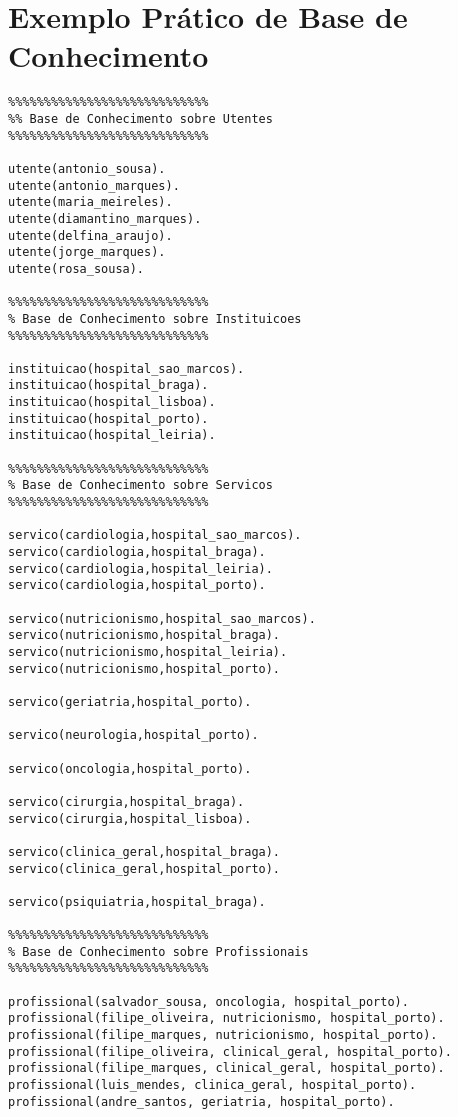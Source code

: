\documentclass[
  oneside,
  10pt, a4paper,
  footinclude=true,
  headinclude=true,
  cleardoublepage=empty
]{scrbook}
\begin{document}
\section{Exemplo Prático de Base de Conhecimento}
	\label{base_conhecimento_anexo}
	\begin{lstlisting}	
%%%%%%%%%%%%%%%%%%%%%%%%%%%%
%% Base de Conhecimento sobre Utentes
%%%%%%%%%%%%%%%%%%%%%%%%%%%%

utente(antonio_sousa).
utente(antonio_marques).
utente(maria_meireles).
utente(diamantino_marques).
utente(delfina_araujo).
utente(jorge_marques).
utente(rosa_sousa).

%%%%%%%%%%%%%%%%%%%%%%%%%%%%
% Base de Conhecimento sobre Instituicoes 
%%%%%%%%%%%%%%%%%%%%%%%%%%%%

instituicao(hospital_sao_marcos).
instituicao(hospital_braga).
instituicao(hospital_lisboa).
instituicao(hospital_porto).
instituicao(hospital_leiria).

%%%%%%%%%%%%%%%%%%%%%%%%%%%%
% Base de Conhecimento sobre Servicos 
%%%%%%%%%%%%%%%%%%%%%%%%%%%%

servico(cardiologia,hospital_sao_marcos).
servico(cardiologia,hospital_braga).
servico(cardiologia,hospital_leiria).
servico(cardiologia,hospital_porto).

servico(nutricionismo,hospital_sao_marcos).
servico(nutricionismo,hospital_braga).
servico(nutricionismo,hospital_leiria).
servico(nutricionismo,hospital_porto).

servico(geriatria,hospital_porto).

servico(neurologia,hospital_porto).

servico(oncologia,hospital_porto).

servico(cirurgia,hospital_braga).
servico(cirurgia,hospital_lisboa).

servico(clinica_geral,hospital_braga).
servico(clinica_geral,hospital_porto).

servico(psiquiatria,hospital_braga).

%%%%%%%%%%%%%%%%%%%%%%%%%%%%
% Base de Conhecimento sobre Profissionais 
%%%%%%%%%%%%%%%%%%%%%%%%%%%%

profissional(salvador_sousa, oncologia, hospital_porto).
profissional(filipe_oliveira, nutricionismo, hospital_porto).
profissional(filipe_marques, nutricionismo, hospital_porto).
profissional(filipe_oliveira, clinical_geral, hospital_porto).
profissional(filipe_marques, clinical_geral, hospital_porto).
profissional(luis_mendes, clinica_geral, hospital_porto).
profissional(andre_santos, geriatria, hospital_porto).


\end{lstlisting}
\end{document}
